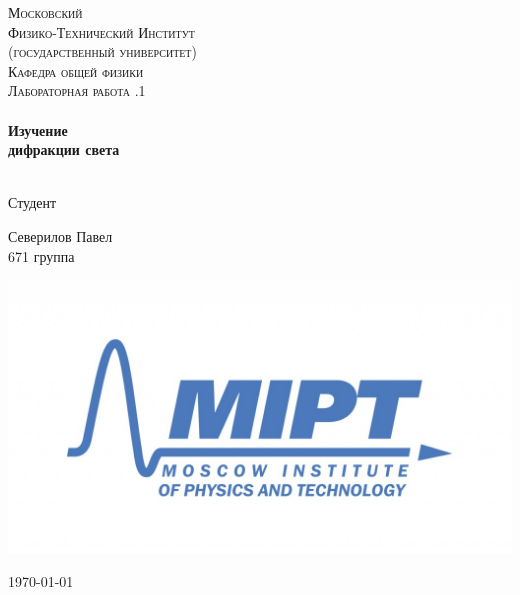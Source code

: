 \begin{titlepage}
\center %
 

\textsc{\LARGE Московский\\[-0.2cm]Физико-Технический Институт\\[0.1cm]\large (государственный университет)}\\[1.5cm] %
\textsc{\Large Кафедра общей физики}\\[0.1cm] %
\textsc{\large Лабораторная работа .1}\\[0.5cm] %


\HRule
\\[0.4cm]
{ \huge \bfseries Изучение\\[0.2cm]
дифракции света}
\\[0.6cm] %
\HRule
\\[1.5cm]


 

	\begin{flushleft} \large
		\textsf{Студент}
		
		Северилов Павел \\[-0.15cm]
		671 группа
	\end{flushleft}

\begin{bottompar}
	\begin{center}
		\includegraphics[width = 80 mm]{logo.jpg}
	\end{center}
	{\large \today}

\end{bottompar}
\vfill %

\end{titlepage}
